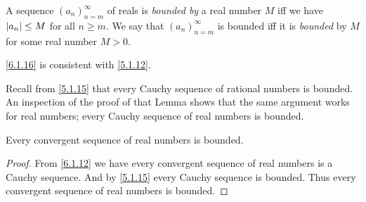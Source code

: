 \begin{defn}\label{6.1.16}
  A sequence \((a_n)_{n = m}^\infty\) of reals is \emph{bounded by} a real number \(M\) iff we have \(\left\lvert a_n\right\rvert \leq M\) for all \(n \geq m\).
  We say that \((a_n)_{n = m}^\infty\) is bounded iff it is \emph{bounded} by \(M\) for some real number \(M > 0\).
\end{defn}

\begin{note}
  \cref{6.1.16} is consistent with \cref{5.1.12}.
\end{note}

\begin{note}
  Recall from \cref{5.1.15} that every Cauchy sequence of rational numbers is bounded.
  An inspection of the proof of that Lemma shows that the same argument works for real numbers;
  every Cauchy sequence of real numbers is bounded.
\end{note}

\begin{cor}\label{6.1.17}
  Every convergent sequence of real numbers is bounded.
\end{cor}

\begin{proof}
  From \cref{6.1.12} we have every convergent sequence of real numbers is a Cauchy sequence.
  And by \cref{5.1.15} every Cauchy sequence is bounded.
  Thus every convergent sequence of real numbers is bounded.
\end{proof}

